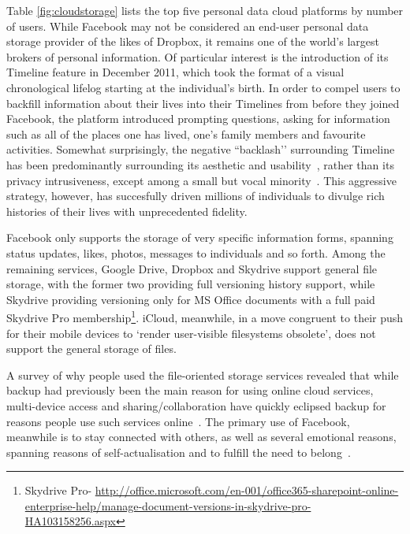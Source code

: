 \documentclass[graybox]{svmult}
\begin{document}
Table \ref{fig:cloudstorage} lists the top five personal data cloud platforms by number of users. While Facebook may not be considered an end-user personal data storage provider of the likes of Dropbox, it remains one of the world's largest brokers of personal information.  Of particular interest is the introduction of its Timeline feature in December 2011, which took the format of a visual chronological lifelog starting at the individual’s birth.  In order to compel users to backfill information about their lives into their Timelines from before they joined Facebook, the platform introduced prompting questions, asking for information such as all of the places one has lived, one’s family members and favourite activities.  Somewhat surprisingly, the negative ``backlash’’  surrounding Timeline has been predominantly surrounding its aesthetic and usability~\cite{mashable-timeline}, rather than its privacy intrusiveness, except among a small but vocal minority~\cite{sophos-timeline}. This aggressive strategy, however, has succesfully driven millions of individuals to divulge rich histories of their lives with unprecedented fidelity.

Facebook only supports the storage of very specific information forms, spanning status updates, likes, photos, messages to individuals and so forth.  Among the remaining services, Google Drive, Dropbox and Skydrive support general file storage, with the former two providing full versioning history support, while Skydrive providing versioning only for MS Office documents with a full paid Skydrive Pro membership\footnote{Skydrive Pro- \url{http://office.microsoft.com/en-001/office365-sharepoint-online-enterprise-help/manage-document-versions-in-skydrive-pro-HA103158256.aspx}}.  iCloud, meanwhile, in a move congruent to their push for their mobile devices to ‘render user-visible filesystems obsolete’,  does not support the general storage of files.  

A survey of why people used the file-oriented storage services revealed that while backup had previously been the main reason for using online cloud services, multi-device access and sharing/collaboration have quickly eclipsed backup for reasons people use such services online~\cite{van2009note}. The primary use of Facebook, meanwhile is to stay connected with others, as well as several emotional reasons, spanning reasons of self-actualisation and to fulfill the need to belong~\cite{nadkarni2012people}.
\end{document}
